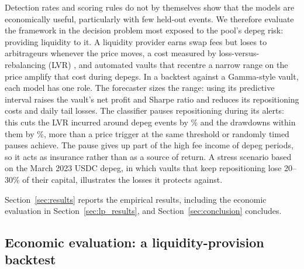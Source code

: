 Detection rates and scoring rules do not by themselves show that the models are economically useful,
particularly with few held-out events. We therefore evaluate the framework in the decision problem most
exposed to the pool's depeg risk: providing liquidity to it. A liquidity provider earns swap fees but loses
to arbitrageurs whenever the price moves, a cost measured by loss-versus-rebalancing (LVR)
\citep{Milionis2022}, and automated vaults that recentre a narrow range on the price amplify that cost
during depegs. In a backtest against a Gamma-style vault, each model has one role. The forecaster sizes the
range: using its predictive interval raises the vault's net profit and Sharpe ratio and reduces its
repositioning costs and daily tail losses. The classifier pauses repositioning during its alerts: this
cuts the LVR incurred around depeg events by \lpFcKEvLVRCut\% and the drawdowns within them by
\lpFcKEventDDCut\%, more than a price trigger at the same threshold or randomly timed pauses achieve. The
pause gives up part of the high fee income of depeg periods, so it acts as insurance rather than as a source
of return. A stress scenario based on the March 2023 USDC depeg, in which vaults that keep repositioning lose
20--30\% of their capital, illustrates the losses it protects against.

Section~\ref{sec:results} reports the empirical results, including the economic evaluation in
Section~\ref{sec:lp_results}, and Section~\ref{sec:conclusion} concludes.


\subsection{Economic evaluation: a liquidity-provision backtest}\label{sec:lp_method}

